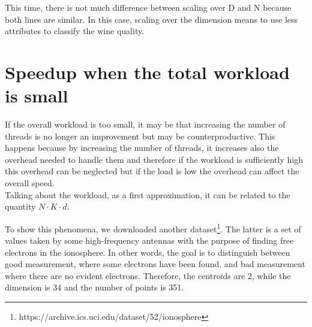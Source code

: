 \documentclass{report}
\begin{document}
\begin{minipage}[b]{0.48\textwidth}
  This time, there is not much difference between scaling over D and N because both lines are similar. In this case, scaling over the dimension means to use less attributes to classify the wine quality.

  \section*{Speedup when the total workload is small }
  If the overall workload is too small, it may be that increasing the number of threads is no longer an improvement but may be counterproductive. This happens because by increasing the number of threads, it increases also the overhead needed to handle them and therefore if the workload is sufficiently high this overhead can be neglected but if the load is low the overhead can affect the overall speed.\\

  Talking about the workload, as a first approximation, it can be related to the quantity $N\cdot K\cdot d$.

  To show this phenomena, we downloaded another dataset\footnote{https://archive.ics.uci.edu/dataset/52/ionosphere}. The latter is a set of values taken by some high-frequency antennas with the purpose of finding free electrons in the ionosphere. In other words, the goal is to distinguish between good measurement, where some electrons have been found, and bad measurement where there are no evident electrons. Therefore, the centroids are 2, while the dimension is 34 and the number of points is 351.
\end{minipage}
\hspace{0.1in}
\end{document}
